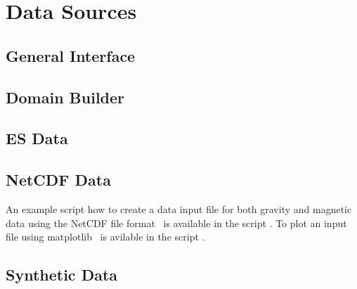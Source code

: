 \chapter{Data Sources}\label{Chp:ref:data sources}

\section{General Interface}

\section{Domain Builder}\label{Chp:ref:domain builder}

\section{ES Data}

\section{NetCDF Data}
An example script how to create a data input file for both gravity and magnetic data using the NetCDF file format~\cite{NETCDF}
is available in the script . To plot an input file using matplotlib~\cite{MATPLTLIB} 
is avilable in the script .

\section{Synthetic Data}
